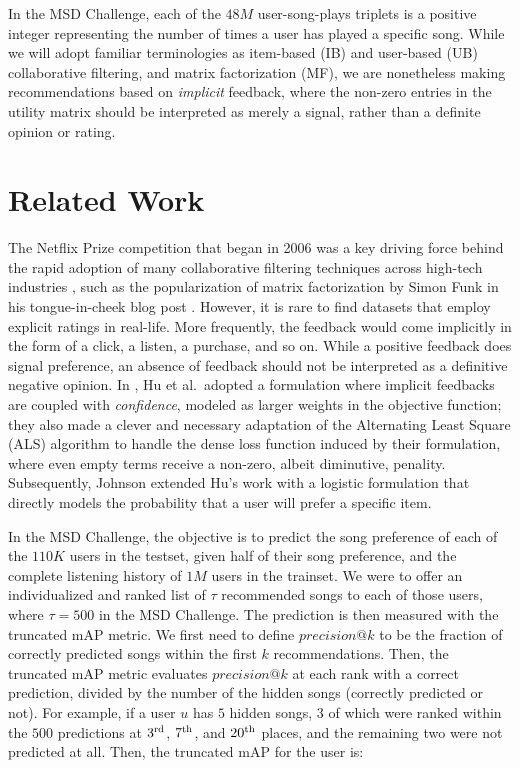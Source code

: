 \documentclass[conference]{IEEEtran}
\newcommand{\mAP}{m\textsc{AP} }
\begin{document}
In the MSD Challenge, each of the $48M$ user-song-plays triplets is a positive integer 
representing the number of times a user has played a specific song. While we will adopt
familiar terminologies as item-based (IB) and user-based (UB)
collaborative filtering, and matrix factorization (MF), we are
nonetheless making recommendations based on {\em implicit} feedback, where
the non-zero entries in the utility matrix should be
interpreted as merely a signal, rather than a definite opinion or rating.

\section{Related Work}

The Netflix Prize competition that began in 2006 was a key
driving force behind the rapid
adoption of many collaborative filtering techniques across high-tech
industries \cite{bennett2007netflix}, such as
the popularization of matrix factorization by Simon Funk in his tongue-in-cheek blog post
\cite{funk2006try}. However, it is rare to find datasets that employ explicit
ratings in real-life.
More frequently, the feedback would come implicitly in the form of a click, a listen, a purchase, and
so on. While a positive feedback does signal preference, an absence of feedback should not be interpreted as a definitive negative opinion. In \cite{hu2008collaborative}, Hu et al.~adopted a
formulation where implicit feedbacks are coupled with {\em confidence}, modeled as larger
weights in the objective function; they also made a clever and necessary adaptation of the
Alternating Least Square (ALS) algorithm to handle the dense
loss function induced by their formulation,
where even empty terms receive a non-zero, albeit diminutive, penality.
Subsequently, Johnson \cite{johnson2014logistic} extended
Hu's work with a logistic formulation that directly models the 
probability that a user will prefer a specific item.

In the MSD Challenge, the objective is to predict the song preference of
each of the $110K$ users in the testset, given half of
their song preference, and the complete listening history
of $1M$ users in the trainset.
We were to offer an individualized and ranked list of
$\tau$ recommended
songs to each of those users, where $\tau = 500$ in the MSD
Challenge.
The prediction is then measured with the truncated
\mAP metric. We first need to define
$precision\textrm{@}k$ to be the fraction of correctly predicted songs
within the first $k$ recommendations. Then, the truncated \mAP metric
evaluates $precision\textrm{@}k$ at each rank with a correct prediction,
divided by the number of the hidden songs (correctly predicted or not).
For example, if a user $u$ has $5$ hidden songs,
$3$ of which were ranked within the $500$ predictions at $3^{\rm rd}$,
$7^{\rm th}$,
and $20^{\rm th}$ places, and the remaining two were not predicted at all.
Then, the truncated
\mAP for the user is:
\end{document}
